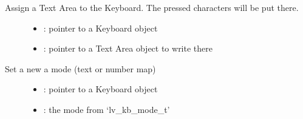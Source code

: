 \documentclass[letterpaper,10pt,english]{sphinxmanual}
\begin{document}

\begin{fulllineitems}
\label{\detokenize{object-types/kb:_CPPv412lv_kb_set_taP8lv_obj_tP8lv_obj_t}}%
\pysigstartmultiline
{}\label{\detokenize{object-types/kb:lv__kb_8h_1ad5db2be870948b48e12e40dfa81fbd64}}%
\pysigstopmultiline
Assign a Text Area to the Keyboard. The pressed characters will be put there. \begin{description}
\item[{}] \leavevmode\begin{itemize}
\item {} 
: pointer to a Keyboard object 

\item {} 
: pointer to a Text Area object to write there 

\end{itemize}

\end{description}


\end{fulllineitems}


\begin{fulllineitems}
\label{\detokenize{object-types/kb:_CPPv414lv_kb_set_modeP8lv_obj_t12lv_kb_mode_t}}%
\pysigstartmultiline
{}\label{\detokenize{object-types/kb:lv__kb_8h_1a0597e70c0663e4fa380da9bf2229cc25}}%
\pysigstopmultiline
Set a new a mode (text or number map) \begin{description}
\item[{}] \leavevmode\begin{itemize}
\item {} 
: pointer to a Keyboard object 

\item {} 
: the mode from ‘lv\_kb\_mode\_t’ 

\end{itemize}

\end{description}


\end{fulllineitems}
\end{document}
